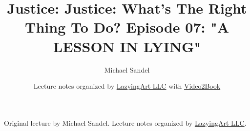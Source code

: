 \documentclass[11pt,oneside]{book}
\begin{document}
\frontmatter
\title{Justice: Justice: What's The Right Thing To Do? Episode 07: "A LESSON IN LYING"}
\author{Michael Sandel}
\date{Lecture notes organized by \href{https://lazying.art}{LazyingArt LLC} with \href{https://github.com/lachlanchen/Video2Book}{Video2Book}}
\maketitle
\begin{center}
\small Original lecture by Michael Sandel. Lecture notes organized by \href{https://lazying.art}{LazyingArt LLC}.
\end{center}
\clearpage
\mainmatter

\end{document}
